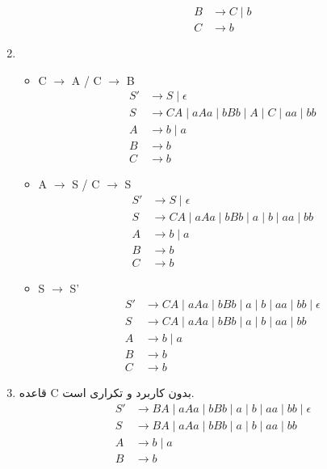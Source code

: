 \begin{enumerate}
\begin{itemize}
\[\begin{aligned}
			B &\rightarrow C \mid b \\
			C &\rightarrow b
		\end{aligned}
		\]
	\end{itemize}
	\item 
	\begin{itemize}
		\item {C $\rightarrow$ A / C $\rightarrow$ B}
		\[
		\begin{aligned}
			S' &\rightarrow S \mid \epsilon \\
			S &\rightarrow CA \mid aAa \mid bBb \mid A \mid C \mid aa \mid bb \\
			A &\rightarrow b \mid a \\
			B &\rightarrow b \\
			C &\rightarrow b
		\end{aligned}
		\]
		\item {A $\rightarrow$ S / C $\rightarrow$ S}
		\[
		\begin{aligned}
			S' &\rightarrow S \mid \epsilon \\
			S &\rightarrow CA \mid aAa \mid bBb \mid a \mid b \mid aa \mid bb \\
			A &\rightarrow b \mid a \\
			B &\rightarrow b \\
			C &\rightarrow b
		\end{aligned}
		\]
		\item {S $\rightarrow$ S'}
		\[
		\begin{aligned}
			S' &\rightarrow CA \mid aAa \mid bBb \mid a \mid b \mid aa \mid bb \mid \epsilon \\
			S &\rightarrow CA \mid aAa \mid bBb \mid a \mid b \mid aa \mid bb \\
			A &\rightarrow b \mid a \\
			B &\rightarrow b \\
			C &\rightarrow b
		\end{aligned}
		\]
	\end{itemize}
	\item {قاعده C بدون کاربرد و تکراری است.}	
	\[\begin{aligned}
		S' &\rightarrow BA \mid aAa \mid bBb \mid a \mid b \mid aa \mid bb \mid \epsilon \\
		S &\rightarrow BA \mid aAa \mid bBb \mid a \mid b \mid aa \mid bb \\
		A &\rightarrow b \mid a \\
		B &\rightarrow b
	\end{aligned}\]
	

\end{enumerate}

